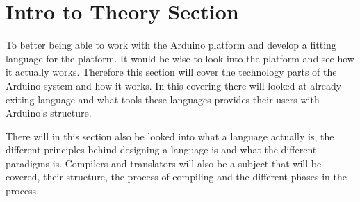 \section{Intro to Theory Section}
To better being able to work with the Arduino platform and develop a fitting language for the platform. It would be wise to look into the platform and see how it actually works. Therefore this section will cover the technology parts of the Arduino system and how it works. In this covering there will looked at already exiting language and what tools these languages provides their users with  Arduino's structure.

There will in this section also be looked into what a language actually is, the different principles behind designing a language is and what the different paradigms is. 
Compilers and translators will also be a subject that will be covered, their structure, the process of compiling and the different phases in the process.